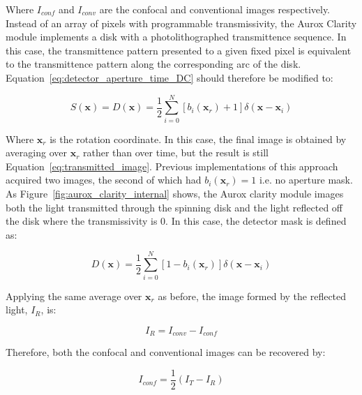 Where $I_{conf}$ and $I_{conv}$ are the confocal and 
conventional images respectively. Instead of an array of 
pixels with programmable transmissivity, the Aurox Clarity 
module implements a disk with a photolithographed 
transmittence sequence. In this case, the transmittence 
pattern presented to a given fixed pixel is equivalent to 
the transmittence pattern along the corresponding arc of 
the disk.\cite{wilson1996confocal} 
Equation~\ref{eq:detector_aperture_time_DC} should therefore 
be modified to:

\begin{equation}\label{eq:detector_aperture_arc}
S\left(\textbf{x}\right) = D\left(\textbf{x}\right) = \frac{1}{2} \sum_{i=0}^{N} \left[b_{i}\left(\textbf{x}_{r}\right) + 1\right]\delta\left(\textbf{x} - \textbf{x}_{i}\right)
\end{equation}

Where $\textbf{x}_{r}$ is the rotation coordinate. In 
this case, the final image is obtained by averaging over 
$\textbf{x}_{r}$ rather than over time, but the result is 
still Equation~\ref{eq:transmitted_image}. Previous 
implementations of this approach acquired two images, the 
second of which had $b_{i}\left(\textbf{x}_{r}\right) = 1$ 
i.e. no aperture mask. As Figure~\ref{fig:aurox_clarity_internal} 
shows, the Aurox clarity module images both the light 
transmitted through the spinning disk and the light 
reflected off the disk where the transmissivity is $0$. In 
this case, the detector mask is defined as:

\begin{equation}\label{eq:detector_aperture_arc_reflect}
	D\left(\textbf{x}\right) = \frac{1}{2} \sum_{i=0}^{N} \left[1 - b_{i}\left(\textbf{x}_{r}\right)\right]\delta\left(\textbf{x} - \textbf{x}_{i}\right)
\end{equation}

Applying the same average over $\textbf{x}_{r}$ as before, 
the image formed by the reflected light, $I_{R}$, is:

\begin{equation}\label{eq:reflected_image}
	I_{R} = I_{conv} - I_{conf}
\end{equation}

Therefore, both the confocal and conventional images can 
be recovered by:

\begin{equation}\label{eq:confocal_image}
	I_{conf} = \frac{1}{2}\left(I_{T} - I_{R}\right)
\end{equation}

